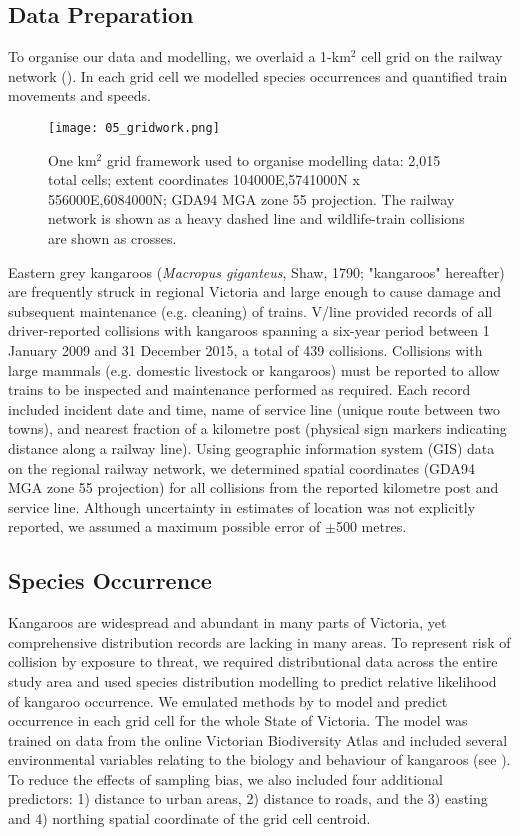 \subsection{Data Preparation}

To organise our data and modelling, we overlaid a 1-km$^2$ cell grid on the railway network ().  In each grid cell we modelled species occurrences and quantified train movements and speeds.

\begin{figure*}[htp]
  \centering
  \texttt{[image: 05\_gridwork.png]}
  \caption[Grid framework used to organise modelling data]{One km$^2$ grid framework used to organise modelling data: 2,015 total cells; extent coordinates 104000E,5741000N x 556000E,6084000N; GDA94 MGA zone 55 projection. The railway network is shown as a heavy dashed line and wildlife-train collisions are shown as crosses.}
  \label{trains_grid}
\end{figure*}

Eastern grey kangaroos (\textit{Macropus giganteus}, Shaw, 1790; "kangaroos" hereafter) are frequently struck in regional Victoria and large enough to cause damage and subsequent maintenance (e.g. cleaning) of trains.  V/line provided records of all driver-reported collisions with kangaroos spanning a six-year period between 1 January 2009 and 31 December 2015, a total of 439 collisions. Collisions with large mammals (e.g. domestic livestock or kangaroos) must be reported to allow trains to be inspected and maintenance performed as required. Each record included incident date and time, name of service line (unique route between two towns), and nearest fraction of a kilometre post (physical sign markers indicating distance along a railway line).  Using geographic information system (GIS) data on the regional railway network, we determined spatial coordinates (GDA94 MGA zone 55 projection) for all collisions from the reported kilometre post and service line. Although uncertainty in estimates of location was not explicitly reported, we assumed a maximum possible error of $\pm$500 metres.

\subsection{Species Occurrence}

Kangaroos are widespread \citep{daws12} and abundant in many parts of Victoria, yet comprehensive distribution records are lacking in many areas. To represent risk of collision by exposure to threat, we required distributional data across the entire study area and used species distribution modelling to predict relative likelihood of kangaroo occurrence.  We emulated methods by \cite{elit08} to model and predict occurrence in each grid cell for the whole State of Victoria. The model was trained on data from the online Victorian Biodiversity Atlas \citep{depi16} and included several environmental variables relating to the biology and behaviour of kangaroos (see ).  To reduce the effects of sampling bias, we also included four additional predictors:  1) distance to urban areas, 2) distance to roads, and the 3) easting and 4) northing spatial coordinate of the grid cell centroid.

